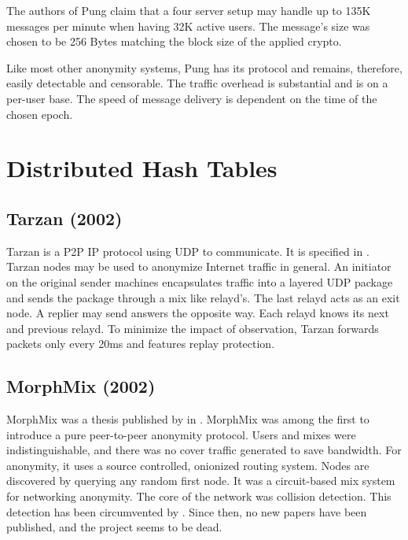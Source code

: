 The authors of Pung claim that a four server setup may handle up to 135K messages per minute when having 32K active users. The message's size was chosen to be 256 Bytes matching the block size of the applied crypto. 

Like most other anonymity systems, Pung has its protocol and remains, therefore, easily detectable and censorable. The traffic overhead is substantial and is on a per-user base. The speed of message delivery is dependent on the time of the chosen epoch.

%

\section{Distributed Hash Tables}
\subsection{Tarzan (2002)}
Tarzan is a P2P IP protocol using UDP to communicate. It is specified in \cite{tarzan:ccs02}. Tarzan nodes may be used to anonymize Internet traffic in general. An initiator on the original sender machines encapsulates traffic into a layered UDP package and sends the package through a mix like relayd's. The last relayd acts as an exit node. A replier may send answers the opposite way. Each relayd knows its next and previous relayd. To minimize the impact of observation, Tarzan forwards packets only every 20ms and features replay protection.

\subsection{MorphMix (2002)}
MorphMix was a thesis published by \citeauthor{morphmix:wpes2002} in \cite{morphmix:wpes2002}. MorphMix was among the first to introduce a pure peer-to-peer anonymity protocol. Users and mixes were indistinguishable, and there was no cover traffic generated to save bandwidth. For anonymity, it uses a source controlled, onionized routing system. Nodes are discovered by querying any random first node. It was a circuit-based mix system for networking anonymity. The core of the network was collision detection. This detection has been circumvented by \cite{morphmix:pet2006}. Since then, no new papers have been published, and the project seems to be dead.

